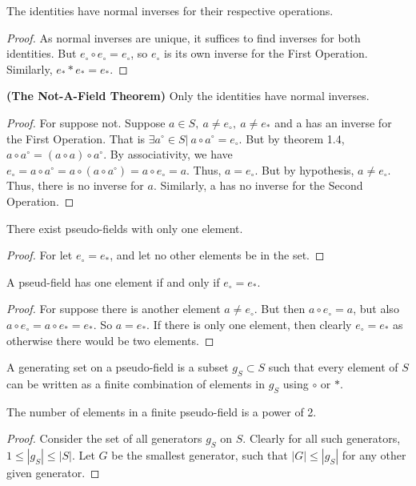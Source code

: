 \documentclass[crop=false,class=book,oneside]{standalone}
\begin{document}
            \begin{theorem} The identities have normal inverses for their respective operations.
            \end{theorem}
            \begin{proof} As normal inverses are unique, it suffices to find inverses for both identities. But $e_{\circ}\circ e_{\circ}=e_{\circ}$, so $e_{\circ}$ is its own inverse for the First Operation. Similarly, $e_{*}*e_{*}=e_{*}$.
            \end{proof}
            \begin{theorem} \textbf{(The Not-A-Field Theorem)} Only the identities have normal inverses.
            \end{theorem}
            \begin{proof} For suppose not. Suppose $a\in S,\ a\ne e_{\circ},\ a\ne e_{*}$ and a has an inverse for the First Operation. That is $\exists a^{\circ}\in S|\ a\circ a^{\circ}=e_{\circ}$. But by theorem 1.4, $a\circ a^{\circ}=(a\circ a)\circ a^{\circ}$. By associativity, we have $e_{\circ}=a\circ a^{\circ} = a\circ (a\circ a^{\circ})=a\circ e_{\circ}=a$. Thus, $a=e_{\circ}$. But by hypothesis, $a\ne e_{\circ}$. Thus, there is no inverse for $a$. Similarly, a has no inverse for the Second Operation.
            \end{proof}
            \begin{theorem}
            There exist pseudo-fields with only one element.
            \end{theorem}
            \begin{proof}
            For let $e_{\circ} = e_{*}$, and let no other elements be in the set. 
            \end{proof}
            \begin{theorem}
            A pseud-field has one element if and only if $e_{\circ} = e_{*}$.
            \end{theorem}
            \begin{proof}
            For suppose there is another element $a \ne e_{\circ}$. But then $a \circ e_{\circ} = a$, but also $a \circ e_{\circ} = a \circ e_{*} = e_{*}$. So $a = e_{*}$. If there is only one element, then clearly $e_{\circ} = e_{*}$ as otherwise there would be two elements.
            \end{proof}
            \begin{definition} A generating set on a pseudo-field is a subset $g_S \subset S$ such that every element of $S$ can be written as a finite combination of elements in $g_S$ using $\circ$ or $*$.
            \end{definition}
            \begin{theorem}
            The number of elements in a finite pseudo-field is a power of 2.
            \end{theorem}
            \begin{proof}
            Consider the set of all generators $g_S$ on $S$. Clearly for all such generators, $1\leq |g_S|\leq |S|$. Let $G$ be the smallest generator, such that $|G| \leq |g_S|$ for any other given generator. 
            \end{proof}
\end{document}
